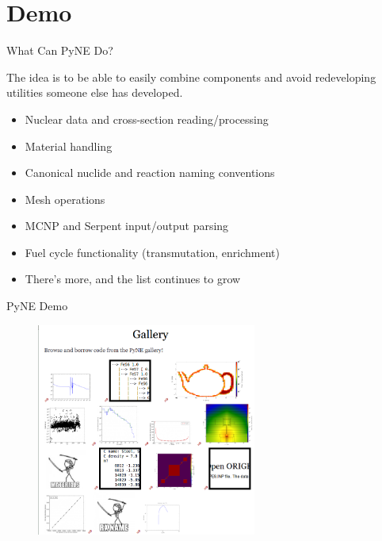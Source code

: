 \documentclass[xcolor=x11names,compress]{beamer}
\renewcommand{\(}{\begin{columns}}
\renewcommand{\)}{\end{columns}}
\newcommand{\<}[1]{\begin{column}{#1}}
\renewcommand{\>}{\end{column}}
\begin{document}
\section{Demo}
\begin{frame}{What Can PyNE Do?}

    The idea is to be able to easily combine components and avoid redeveloping
    utilities someone else has developed.

    \begin{itemize}
    \item Nuclear data and cross-section reading/processing
    \item Material handling
    \item Canonical nuclide and reaction naming conventions
    \item Mesh operations
    \item MCNP and Serpent input/output parsing
    \item Fuel cycle functionality (transmutation, enrichment)
    \item There's more, and the list continues to grow
    \end{itemize}
    
\end{frame}

\begin{frame}{PyNE Demo}
    
    \begin{center}
 	\begin{figure}
 	\includegraphics[height=2.75in,clip]{Gallery}
    \end{figure}
 	\end{center}

\end{frame}
\end{document}
